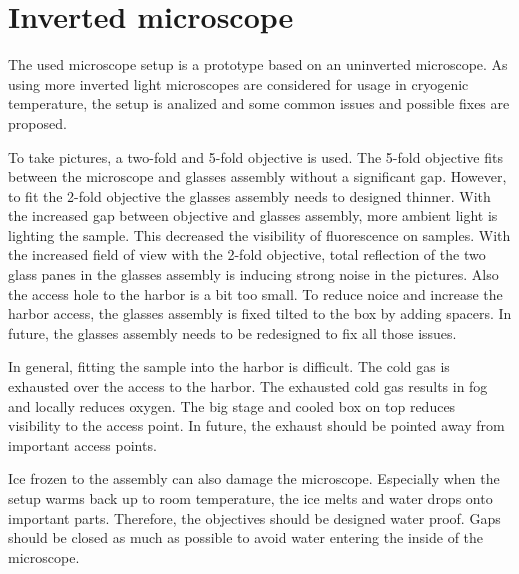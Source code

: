 \section{Inverted microscope}

The used microscope setup is a prototype based on an uninverted microscope. As using more inverted light microscopes are considered for usage in cryogenic temperature, the setup is analized and some common issues and possible fixes are proposed.

To take pictures, a two-fold and 5-fold objective is used. The 5-fold objective fits between the microscope and glasses assembly without a significant gap. However, to fit the 2-fold objective the glasses assembly needs to designed thinner. With the increased gap between objective and glasses assembly, more ambient light is lighting the sample. This decreased the visibility of fluorescence on samples. With the increased field of view with the 2-fold objective, total reflection of the two glass panes in the glasses assembly is inducing strong noise in the pictures. Also the access hole to the harbor is a bit too small.
To reduce noice and increase the harbor access, the glasses assembly is fixed tilted to the box by adding spacers. In future, the glasses assembly needs to be redesigned to fix all those issues.

In general, fitting the sample into the harbor is difficult. The cold gas is exhausted over the access to the harbor. The exhausted cold gas results in fog and locally reduces oxygen. The big stage and cooled box on top reduces visibility to the access point. In future, the exhaust should be pointed away from important access points.

Ice frozen to the assembly can also damage the microscope. Especially when the setup warms back up to room temperature, the ice melts and water drops onto important parts. Therefore, the objectives should be designed water proof. Gaps should be closed as much as possible to avoid water entering the inside of the microscope.